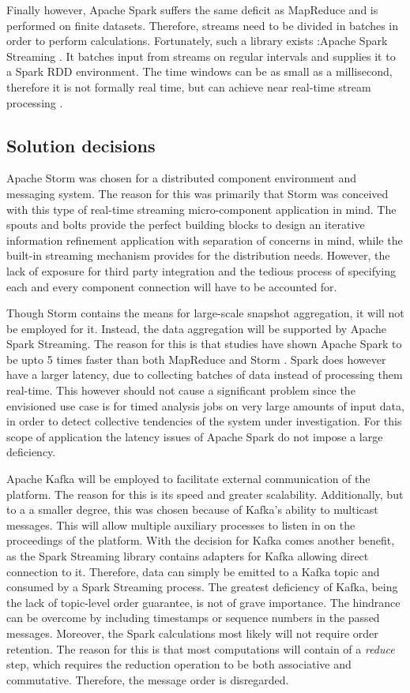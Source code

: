 Finally however, Apache Spark suffers the same deficit as MapReduce and is performed on finite datasets. Therefore, streams need to be divided in batches in order to perform calculations. Fortunately, such a library exists :Apache Spark Streaming \cite{web:spark_streaming}. It batches input from streams on regular intervals and supplies it to a Spark RDD environment. The time windows can be as small as a millisecond, therefore it is not formally real time, but can achieve near real-time stream processing \cite{dstreams}.


\subsection{Solution decisions}
\label{sec:solution_decision}
Apache Storm was chosen for a distributed component environment and messaging system. The reason for this was primarily that Storm was conceived with this type of real-time streaming micro-component application in mind. The spouts and bolts provide the perfect building blocks to design an iterative information refinement application with separation of concerns in mind, while the built-in streaming mechanism provides for the distribution needs. However, the lack of exposure for third party integration and the tedious process of specifying each and every component connection will have to be accounted for.

Though Storm contains the means for large-scale snapshot aggregation, it will not be employed for it. Instead, the data aggregation will be supported by Apache Spark Streaming. The reason for this is that studies have shown Apache Spark to be upto 5 times faster than both MapReduce \cite{mapreduce_vs_spark} and Storm \cite{spark_vs_storm}. Spark does however have a larger latency, due to collecting batches of data instead of processing them real-time. This however should not cause a significant problem since the envisioned use case is for timed analysis jobs on very large amounts of input data, in order to detect collective tendencies of the system under investigation. For this scope of application the latency issues of Apache Spark do not impose a large deficiency.

Apache Kafka will be employed to facilitate external communication of the platform. The reason for this is its speed and greater scalability. Additionally, but to a a smaller degree, this was chosen because of Kafka's ability to multicast messages. This will allow multiple auxiliary processes to listen in on the proceedings of the platform. With the decision for Kafka comes another benefit, as the Spark Streaming library contains adapters for Kafka allowing direct connection to it. Therefore, data can simply be emitted to a Kafka topic and consumed by a Spark Streaming process. The greatest deficiency of Kafka, being the lack of topic-level order guarantee, is not of grave importance. The hindrance can be overcome by including timestamps or sequence numbers in the passed messages. Moreover, the Spark calculations most likely will not require order retention. The reason for this is that most computations will contain of a \emph{reduce} step, which requires the reduction operation to be both associative and commutative. Therefore, the message order is disregarded.

